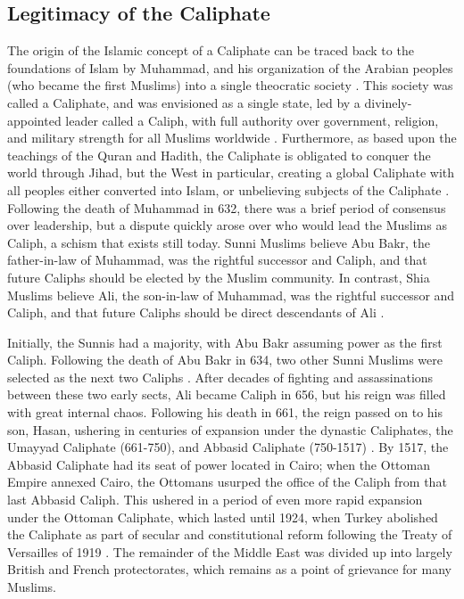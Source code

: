 \documentclass{report}
\begin{document}
    


\subsection{Legitimacy of the Caliphate}

The origin of the Islamic concept of a Caliphate can be traced back to the foundations of Islam by Muhammad, and his organization of the Arabian peoples (who became the first Muslims) into a single theocratic society  \cite{schmidt2004great,holt1977cambridge}. This society was called a Caliphate, and was envisioned as a single state, led by a divinely-appointed leader called a Caliph, with full authority over government, religion, and military strength for all Muslims worldwide \cite{lapidus2002history}. Furthermore, as based upon the teachings of the Quran and Hadith, the Caliphate is obligated to conquer the world through Jihad, but the West in particular, creating a global Caliphate with all peoples either converted into Islam, or unbelieving subjects of the Caliphate \cite{dawood2003koran,arabi2008divine,karsh2007islamic}. Following the death of Muhammad in 632, there was a brief period of consensus over leadership, but a dispute quickly arose over who would lead the Muslims as Caliph, a schism that exists still today. Sunni Muslims believe  Abu Bakr, the father-in-law of Muhammad, was the rightful successor and Caliph, and that future Caliphs should be elected by the Muslim community. In contrast, Shia Muslims believe  Ali, the son-in-law of Muhammad, was the rightful successor and Caliph, and that future Caliphs should be direct descendants of Ali \cite{karsh2007islamic,schmidt2004great}. 

Initially, the Sunnis had a majority, with Abu Bakr assuming power as the first Caliph. Following the death of Abu Bakr in 634, two other Sunni Muslims were selected as the next two Caliphs \cite{schmidt2004great}. After decades of fighting and assassinations between these two early sects, Ali became Caliph in 656, but his reign was filled with great internal chaos. Following his death in 661, the reign passed on to his son, Hasan, ushering in centuries of expansion under the dynastic Caliphates, the Umayyad Caliphate (661-750), and Abbasid Caliphate (750-1517) \cite{schmidt2004great,oliver2009caliphate}. By 1517, the Abbasid Caliphate had its seat of power located in Cairo; when the Ottoman Empire annexed Cairo, the Ottomans usurped the office of the Caliph from that last Abbasid Caliph. This ushered in a period of even more rapid expansion under  the Ottoman Caliphate, which lasted until 1924, when Turkey abolished the Caliphate as part of secular and constitutional reform following the Treaty of Versailles of 1919 \cite{schmidt2004great,ozoglu2011caliphate}. The remainder of the Middle East was divided up into largely British and French protectorates, which remains as a point of grievance for many Muslims.
\end{document}
